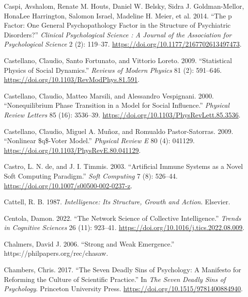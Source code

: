 \documentclass[
  a4paper,
  DIV=11,
  numbers=noendperiod,
  oneside]{scrreprt}
\newlength{\cslhangindent}
\newenvironment{CSLReferences}[2] %
 {\begin{list}{}{%
  \setlength{\itemindent}{0pt}
  \setlength{\leftmargin}{0pt}
  \setlength{\parsep}{0pt}
  \ifodd #1
   \setlength{\leftmargin}{\cslhangindent}
   \setlength{\itemindent}{-1\cslhangindent}
  \fi
  \setlength{\itemsep}{#2\baselineskip}}}
 {\end{list}}
\begin{document}
\begin{CSLReferences}{1}{0}
Caspi, Avshalom, Renate M. Houts, Daniel W. Belsky, Sidra J.
Goldman-Mellor, HonaLee Harrington, Salomon Israel, Madeline H. Meier,
et al. 2014. {``The p {Factor}: {One General Psychopathology Factor} in
the {Structure} of {Psychiatric Disorders}?''} \emph{Clinical
Psychological Science : A Journal of the Association for Psychological
Science} 2 (2): 119--37. \url{https://doi.org/10.1177/2167702613497473}.

Castellano, Claudio, Santo Fortunato, and Vittorio Loreto. 2009.
{``Statistical Physics of Social Dynamics.''} \emph{Reviews of Modern
Physics} 81 (2): 591--646.
\url{https://doi.org/10.1103/RevModPhys.81.591}.

Castellano, Claudio, Matteo Marsili, and Alessandro Vespignani. 2000.
{``Nonequilibrium {Phase Transition} in a {Model} for {Social
Influence}.''} \emph{Physical Review Letters} 85 (16): 3536--39.
\url{https://doi.org/10.1103/PhysRevLett.85.3536}.

Castellano, Claudio, Miguel A. Muñoz, and Romualdo Pastor-Satorras.
2009. {``Nonlinear \$q\$-Voter Model.''} \emph{Physical Review E} 80
(4): 041129. \url{https://doi.org/10.1103/PhysRevE.80.041129}.

Castro, L. N. de, and J. I. Timmis. 2003. {``Artificial Immune Systems
as a Novel Soft Computing Paradigm.''} \emph{Soft Computing} 7 (8):
526--44. \url{https://doi.org/10.1007/s00500-002-0237-z}.

Cattell, R. B. 1987. \emph{Intelligence: {Its Structure}, {Growth} and
{Action}}. {Elsevier}.

Centola, Damon. 2022. {``The Network Science of Collective
Intelligence.''} \emph{Trends in Cognitive Sciences} 26 (11): 923--41.
\url{https://doi.org/10.1016/j.tics.2022.08.009}.

Chalmers, David J. 2006. {``Strong and Weak Emergence.''}
https://philpapers.org/rec/chasaw.

Chambers, Chris. 2017. {``The {Seven Deadly Sins} of {Psychology}: {A
Manifesto} for {Reforming} the {Culture} of {Scientific Practice}.''} In
\emph{The {Seven Deadly Sins} of {Psychology}}. {Princeton University
Press}. \url{https://doi.org/10.1515/9781400884940}.


\end{CSLReferences}
\end{document}
